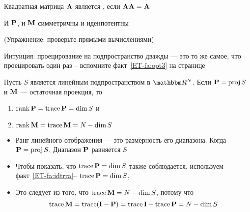 \begin{frame}
    
    \vspace{2em}
    Квадратная матрица $\mathbf A$ является , 
    если $\mathbf A \mathbf A = \mathbf A$ 
    
    \vspace{.7em}
    \Fact{\eqref{ET-fa:pmsi}}
        И $\mathbf P$, и $\mathbf M$ симметричны и иденпотентны
    
    (Упражнение: проверьте прямыми вычислениями)
    
    \vspace{.7em}
    Интуиция: проецирование
    на подпространство дважды --- это то же самое, что проецировать один раз -- вспомните 
    факт~\ref{ET-fa:opt3} на странице~\pageref{ET-fa:opt3}
    
\end{frame}

\begin{frame}
    
    \vspace{2em}
    \Fact{\eqref{ET-fa:trop}}
    Пусть $S$ является линейным подпространством в $\RR^N$. Если $\mathbf P = \operatorname{proj} S$ и 
    $\mathbf M$ --- остаточная проекция, то
    \begin{enumerate}
        \item $\operatorname{rank} \mathbf P  = \operatorname{trace} \mathbf P  = \dim S$ и
        \item $\operatorname{rank} \mathbf M  = \operatorname{trace} \mathbf M  = N - \dim S$
    \end{enumerate}
  
  
    \Prf
    \begin{itemize}
        \item Ранг линейного отображения --- это размерность его диапазона.  Когда $\mathbf P = \operatorname{proj} S$, Диапазон
            $\mathbf P$ равняется $S$
        \item Чтобы показать, что $\operatorname{trace} \mathbf P = \dim S$ также соблюдается, используем 
        факт~\ref{ET-fa:idtrra}--  $\operatorname{trace}\mathbf P
                = \dim S$, 
        \item Это следует из того, что $\operatorname{trace}\mathbf M = N - \dim S$, потому что
            \begin{equation*}
                \operatorname{trace}\mathbf M 
                = \operatorname{trace}(\mathbf I - \mathbf P) 
                = \operatorname{trace} \mathbf I - \operatorname{trace}\mathbf P 
                = N - \dim S
            \end{equation*}

    \end{itemize}
  
\end{frame}


